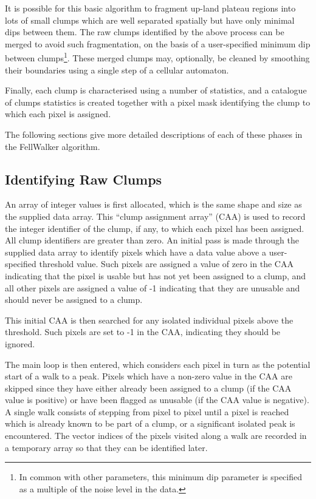 \documentclass[final,authoryear,5p,times,twocolumn]{elsarticle}
\begin{document}
It is possible for this basic algorithm to fragment up-land plateau
regions into lots of small clumps which are well separated spatially but
have only minimal dips between them. The raw clumps identified by the above
process can be merged to avoid such fragmentation, on the basis of a
user-specified minimum dip between clumps\footnote{In common with other
parameters, this minimum dip parameter is specified as a multiple of the
noise level in the data.}. These merged clumps may,
optionally, be cleaned by smoothing their boundaries using a single step
of a cellular automaton.

Finally, each clump is characterised using a number of statistics, and a
catalogue of clumps statistics is created together with a pixel mask
identifying the clump to which each pixel is assigned.

The following sections give more detailed descriptions of each of these
phases in the FellWalker algorithm.

\subsection{Identifying Raw Clumps}
\label{sec:raw}
An array of integer values is first allocated, which is the same shape
and size as the supplied data array. This ``clump assignment array''
(CAA) is used to record the integer identifier of the clump, if any, to
which each pixel has been assigned. All clump identifiers are greater
than zero. An initial pass is made through the supplied data array to
identify pixels which have a data value above a user-specified threshold
value. Such pixels are assigned a value of zero in the CAA indicating
that the pixel is usable but has not yet been assigned to a clump, and
all other pixels are assigned a value of -1 indicating that they are
unusable and should never be assigned to a clump.

This initial CAA is then searched for any isolated individual pixels
above the threshold. Such pixels are set to -1 in the CAA, indicating
they should be ignored.

The main loop is then entered, which considers each pixel in turn as the
potential start of a walk to a peak. Pixels which have a non-zero value
in the CAA are skipped since they have either already been assigned to a
clump (if the CAA value is positive) or have been flagged as unusable (if
the CAA value is negative). A single walk consists of stepping from pixel
to pixel until a pixel is reached which is already known to be part of a
clump, or a significant isolated peak is encountered. The vector indices of
the pixels visited along a walk are recorded in a temporary array so that
they  can be identified later.
\end{document}
